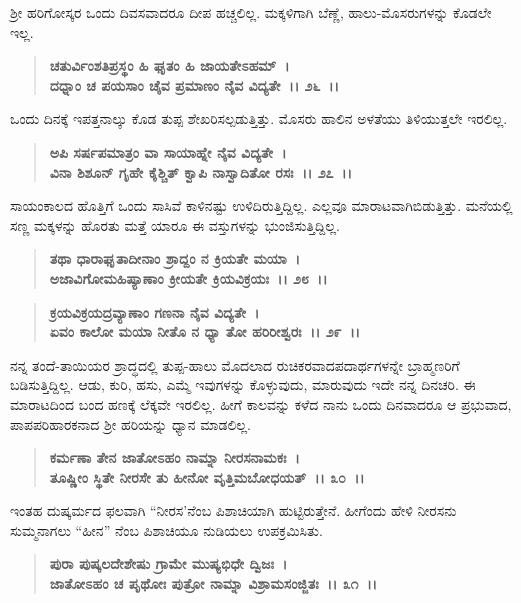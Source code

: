 ಶ‍್ರೀ ಹರಿಗೋಸ್ಕರ ಒಂದು ದಿವಸವಾದರೂ ದೀಪ ಹಚ್ಚಲಿಲ್ಲ. ಮಕ್ಕಳಿಗಾಗಿ ಬೆಣ್ಣೆ, ಹಾಲು-ಮೊಸರುಗಳನ್ನು ಕೊಡಲೇ ಇಲ್ಲ.

\begin{verse}
\textbf{ಚತುರ್ವಿಂಶತಿಪ್ರಸ್ಥಂ ಹಿ ಘೃತಂ ಹಿ ಜಾಯತೇಽಹಮ್~।}\\\textbf{ದಧ್ನಾಂ ಚ ಪಯಸಾಂ ಚೈವ ಪ್ರಮಾಣಂ ನೈವ ವಿದ್ಯತೇ~।। ೨೬~।।}
\end{verse}

ಒಂದು ದಿನಕ್ಕೆ ಇಪತ್ತನಾಲ್ಕು ಕೊಡ ತುಪ್ಪ ಶೇಖರಿಸಲ್ಪಡುತ್ತಿತ್ತು. ಮೊಸರು ಹಾಲಿನ ಅಳತೆಯು ತಿಳಿಯುತ್ತಲೇ ಇರಲಿಲ್ಲ.

\begin{verse}
\textbf{ಅಪಿ ಸರ್ಷಪಮಾತ್ರಂ ವಾ ಸಾಯಾಹ್ನೇ ನೈವ ವಿದ್ಯತೇ~।}\\\textbf{ವಿನಾ ಶಿಶೂನ್‌ ಗೃಹೇ ಕೈಶ್ಚಿತ್ ಕ್ವಾಪಿ ನಾಸ್ವಾದಿತೋ ರಸಃ~।। ೨೭~।।}
\end{verse}

ಸಾಯಂಕಾಲದ ಹೊತ್ತಿಗೆ ಒಂದು ಸಾಸಿವೆ ಕಾಳಿನಷ್ಟು ಉಳಿದಿರುತ್ತಿದ್ದಿಲ್ಲ. ಎಲ್ಲವೂ ಮಾರಾಟವಾಗಿಬಿಡುತ್ತಿತ್ತು. ಮನೆಯಲ್ಲಿ ಸಣ್ಣ ಮಕ್ಕಳನ್ನು ಹೊರತು ಮತ್ತೆ ಯಾರೂ ಈ ವಸ್ತುಗಳನ್ನು ಭುಂಜಿಸುತ್ತಿದ್ದಿಲ್ಲ.

\begin{verse}
\textbf{ತಥಾ ಧಾರಾಘೃತಾದೀನಾಂ ಶ್ರಾದ್ದಂ ನ ಕ್ರಿಯತೇ ಮಯಾ~।}\\\textbf{ಅಜಾವಿಗೋಮಹಿಷ್ಯಾಣಾಂ ಕ್ರೀಯತೇ ಕ್ರಿಯವಿಕ್ರಯಃ~।। ೨೮~।। }
\end{verse}

\begin{verse}
\textbf{ಕ್ರಯವಿಕ್ರಯದ್ರವ್ಯಾಣಾಂ ಗಣನಾ ನೈವ ವಿದ್ಯತೇ~।}\\\textbf{ಏವಂ ಕಾಲೋ ಮಯಾ ನೀತೊ ನ ಧ್ಯಾ ತೋ ಹರಿರೀಶ್ವರಃ~।। ೨೯~।।}
\end{verse}

ನನ್ನ ತಂದೆ-ತಾಯಿಯರ ಶ್ರಾದ್ಧದಲ್ಲಿ ತುಪ್ಪ-ಹಾಲು ಮೊದಲಾದ ರುಚಿಕರವಾದ\break ಪದಾರ್ಥಗಳನ್ನೇ ಬ್ರಾಹ್ಮಣರಿಗೆ ಬಡಿಸುತ್ತಿದ್ದಿಲ್ಲ. ಆಡು, ಕುರಿ, ಹಸು, ಎಮ್ಮೆ ಇವುಗಳನ್ನು ಕೊಳ್ಳುವುದು, ಮಾರುವುದು ಇದೇ ನನ್ನ ದಿನಚರಿ. ಈ ಮಾರಾಟದಿಂದ ಬಂದ ಹಣಕ್ಕೆ ಲೆಕ್ಕವೇ ಇರಲಿಲ್ಲ. ಹೀಗೆ ಕಾಲವನ್ನು ಕಳೆದ ನಾನು ಒಂದು ದಿನವಾದರೂ ಆ ಪ್ರಭುವಾದ, ಪಾಪಪರಿಹಾರಕನಾದ ಶ‍್ರೀ ಹರಿಯನ್ನು ಧ್ಯಾನ ಮಾಡಲಿಲ್ಲ.

\begin{verse}
\textbf{ಕರ್ಮಣಾ ತೇನ ಜಾತೋಽಹಂ ನಾಮ್ನಾ ನೀರಸನಾಮಕಃ~।}\\\textbf{ತೂಷ್ಣೀಂ ಸ್ಥಿತೇ ನೀರಸೇ ತು ಹೀನೋ ವೃತ್ತಿಮಬೋಧಯತ್~।। ೩೦~।।}
\end{verse}

ಇಂತಹ ದುಷ್ಕರ್ಮದ ಫಲವಾಗಿ “ನೀರಸ'ನೆಂಬ ಪಿಶಾಚಿಯಾಗಿ ಹುಟ್ಟಿರುತ್ತೇನೆ. ಹೀಗೆಂದು ಹೇಳಿ ನೀರಸನು ಸುಮ್ಮನಾಗಲು “ಹೀನ” ನೆಂಬ ಪಿಶಾಚಿಯೂ ನುಡಿಯಲು ಉಪಕ್ರಮಿಸಿತು.

\begin{verse}
\textbf{ಪುರಾ ಪುಷ್ಕಲದೇಶೇಷು ಗ್ರಾಮೇ ಮುಷ್ಯಭಿಧೇ ದ್ವಿಜಃ~।}\\\textbf{ಜಾತೋಽಹಂ ಚ ಪೃಥೋಃ ಪುತ್ರೋ ನಾಮ್ನಾ ವಿಶ್ರಾಮಸಂಜ್ಜಿತಃ~।। ೩೧~।।}
\end{verse}


